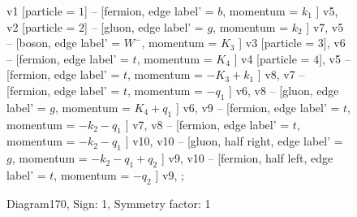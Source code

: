 \documentclass{revtex4}
\begin{document}
\begin{figure}[!htb]
\begin{center}
{    %
v1 [particle = \(1\)] -- [fermion, edge label' = \(b\), momentum = \(k_{1}\) ] v5, 
v2 [particle = \(2\)] -- [gluon, edge label' = \(g\), momentum = \(k_{2}\) ] v7, 
v5 -- [boson, edge label' = \(W^{-}\), momentum = \(K_{3}\) ] v3 [particle = \(3\)], 
v6 -- [fermion, edge label' = \(t\), momentum = \(K_{4}\) ] v4 [particle = \(4\)], 
v5 -- [fermion, edge label' = \(t\), momentum = \(-K_{3} + k_{1}\) ] v8, 
v7 -- [fermion, edge label' = \(t\), momentum = \(-q_{1}\) ] v6, 
v8 -- [gluon, edge label' = \(g\), momentum = \(K_{4} + q_{1}\) ] v6, 
v9 -- [fermion, edge label' = \(t\), momentum = \(-k_{2} - q_{1}\) ] v7, 
v8 -- [fermion, edge label' = \(t\), momentum = \(-k_{2} - q_{1}\) ] v10, 
v10 -- [gluon, half right, edge label' = \(g\), momentum = \(-k_{2} - q_{1} + q_{2}\) ] v9, 
v10 -- [fermion, half left, edge label' = \(t\), momentum = \(-q_{2}\) ] v9, 
};
\end{center}
\caption{Diagram170, Sign: 1, Symmetry factor: 1}
\end{figure}
\newpage
\end{document}
